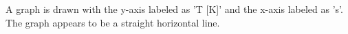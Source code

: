 A graph is drawn with the y-axis labeled as 'T [K]' and the x-axis labeled as 's'. The graph appears to be a straight horizontal line.